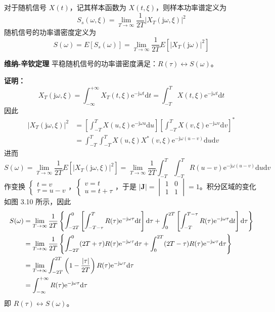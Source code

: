 \documentclass[11pt,openany,UTF8]{ctexbook}
\newcommand{\dif}{\mathrm{d}}                      %
\newcommand{\eu}{\mathrm{e}}                       %
\newcommand{\ju}{\mathrm{j}}                       %
\newcommand{\E}{E}                                 %
\newcommand{\thm}[1]{\par\medskip\noindent\textbf{#1}\quad}
\begin{document}
对于随机信号 $X(t)$\nobreak，记其样本函数为 $X(t,\xi)$\nobreak，则样本功率谱定义为
\begin{equation}
S_s(\omega,\xi)=\lim_{T\to\infty}\frac{1}{2T}\left|X_T(\ju\omega,\xi)\right|^2
\label{eq:3.24}
\end{equation}
随机信号的功率谱密度定义为
\begin{equation}
S(\omega)=\E\left[S_s(\omega)\right]=\lim_{T\to\infty}\frac{1}{2T}\E\left[\left|X_T(\ju\omega)\right|^2\right]
\label{eq:3.25}
\end{equation}

\thm{维纳-辛钦定理} 平稳随机信号的功率谱密度满足\nobreak：$R(\tau)\longleftrightarrow S(\omega)$\nobreak。

\textbf{证明\nobreak：}
\[
X_T(\ju\omega,\xi)=\int_{-\infty}^{+\infty}X_T(t,\xi)\eu^{-\ju\omega t}\dif t=\int_{-T}^{T}X(t,\xi)\eu^{-\ju\omega t}\dif t
\]
因此
\[
\begin{aligned}
\left|X_T(\ju\omega,\xi)\right|^2&=\left[\int_{-T}^{T}X(u,\xi)\eu^{-\ju\omega u}\dif u\right]\left[\int_{-T}^{T}X(v,\xi)\eu^{-\ju\omega v}\dif v\right]^{*}\\
&=\int_{-T}^{T}\int_{-T}^{T}X(u,\xi)X^{*}(v,\xi)\eu^{-\ju\omega(u-v)}\dif u\dif v
\end{aligned}
\]
进而
\[
S(\omega)=\lim_{T\to\infty}\frac{1}{2T}\E\left[\left|X_T(\ju\omega,\xi)\right|^2\right]=\lim_{T\to\infty}\frac{1}{2T}\int_{-T}^{T}\int_{-T}^{T}R(u-v)\eu^{-\ju\omega(u-v)}\dif u\dif v
\]
作变换 $\begin{cases}t=v\\ \tau=u-v\end{cases}$\nobreak，$\begin{cases}v=t\\ u=t+\tau\end{cases}$\nobreak，于是 $\lvert\bm{J}\rvert=\begin{vmatrix}1&0\\1&1\end{vmatrix}=1$\nobreak。积分区域的变化如图 3.10 所示\nobreak，因此
\[
\resizebox{\linewidth}{!}{$\displaystyle
\begin{aligned}
S(\omega)&=\lim_{T\to\infty}\frac{1}{2T}\left\{\int_{-2T}^{0}\left[\int_{-T-\tau}^{T}R(\tau)\eu^{-\ju\omega\tau}\dif t\right]\dif\tau+\int_{0}^{2T}\left[\int_{-T}^{T-\tau}R(\tau)\eu^{-\ju\omega\tau}\dif t\right]\dif\tau\right\}\\
&=\lim_{T\to\infty}\frac{1}{2T}\left\{\int_{-2T}^{0}(2T+\tau)R(\tau)\eu^{-\ju\omega\tau}\dif\tau+\int_{0}^{2T}(2T-\tau)R(\tau)\eu^{-\ju\omega\tau}\dif\tau\right\}\\
&=\lim_{T\to\infty}\int_{-2T}^{2T}\left(1-\frac{\lvert\tau\rvert}{2T}\right)R(\tau)\eu^{-\ju\omega\tau}\dif\tau\\
&=\int_{-\infty}^{+\infty}R(\tau)\eu^{-\ju\omega\tau}\dif\tau
\end{aligned}$}
\]
即 $R(\tau)\longleftrightarrow S(\omega)$\nobreak。
\end{document}
